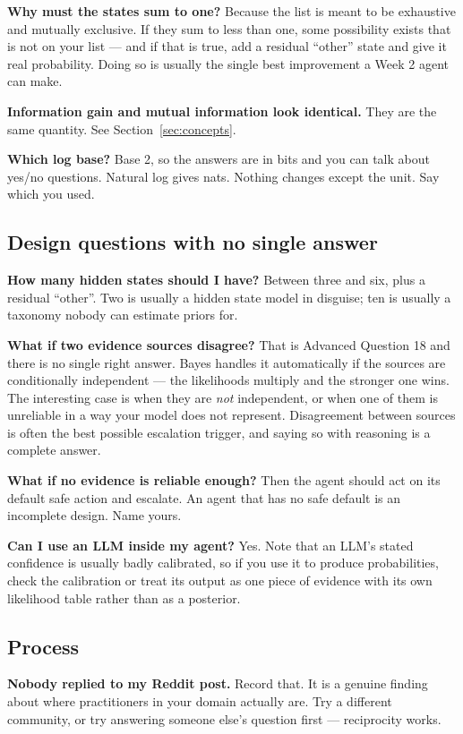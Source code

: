 \documentclass[11pt,a4paper]{article}
\begin{document}
\textbf{Why must the states sum to one?} Because the list is meant to be exhaustive and mutually
exclusive. If they sum to less than one, some possibility exists that is not on your list --- and
if that is true, add a residual ``other'' state and give it real probability. Doing so is usually
the single best improvement a Week 2 agent can make.

\textbf{Information gain and mutual information look identical.} They are the same quantity. See
Section~\ref{sec:concepts}.

\textbf{Which log base?} Base 2, so the answers are in bits and you can talk about yes/no
questions. Natural log gives nats. Nothing changes except the unit. Say which you used.

\subsection{Design questions with no single answer}

\textbf{How many hidden states should I have?} Between three and six, plus a residual ``other''.
Two is usually a hidden state model in disguise; ten is usually a taxonomy nobody can estimate
priors for.

\textbf{What if two evidence sources disagree?} That is Advanced Question 18 and there is no single
right answer. Bayes handles it automatically if the sources are conditionally independent --- the
likelihoods multiply and the stronger one wins. The interesting case is when they are \emph{not}
independent, or when one of them is unreliable in a way your model does not represent. Disagreement
between sources is often the best possible escalation trigger, and saying so with reasoning is a
complete answer.

\textbf{What if no evidence is reliable enough?} Then the agent should act on its default safe
action and escalate. An agent that has no safe default is an incomplete design. Name yours.

\textbf{Can I use an LLM inside my agent?} Yes. Note that an LLM's stated confidence is usually
badly calibrated, so if you use it to produce probabilities, check the calibration or treat its
output as one piece of evidence with its own likelihood table rather than as a posterior.

\subsection{Process}

\textbf{Nobody replied to my Reddit post.} Record that. It is a genuine finding about where
practitioners in your domain actually are. Try a different community, or try answering someone
else's question first --- reciprocity works.
\end{document}
